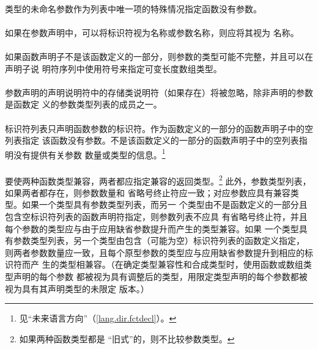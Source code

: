 \paragraph{}
类型的未命名参数作为列表中唯一项的特殊情况指定函数没有参数。

\paragraph{}
如果在参数声明中，可以将标识符视为名称或参数名称，则应将其视为
名称。

\paragraph{}
如果函数声明子不是该函数定义的一部分，则参数的类型可能不完整，并且可以在声明子说
明符序列中使用\tm{[*]}符号来指定可变长度数组类型。

\paragraph{}
参数声明的声明说明符中的存储类说明符（如果存在）将被忽略，除非声明的参数是函数定
义的参数类型列表的成员之一。

\paragraph{}
标识符列表只声明函数参数的标识符。作为函数定义的一部分的函数声明子中的空列表指定
该函数没有参数。不是该函数定义的一部分的函数声明子中的空列表指明没有提供有关参数
数量或类型的信息。\footnote{见``未来语言方向''（\ref{lang.dir.fctdecl}）。}

\paragraph{}
要使两种函数类型兼容，两者都应指定兼容的返回类型。\footnote{如果两种函数类型都是
``旧式''的，则不比较参数类型。} 此外，参数类型列表，如果两者都存在，则参数数量和
省略号终止符应一致；对应参数应具有兼容类型。如果一个类型具有参数类型列表，而另一
个类型由不是函数定义的一部分且包含空标识符列表的函数声明符指定，则参数列表不应具
有省略号终止符，并且每个参数的类型应与由于应用缺省参数提升而产生的类型兼容。如果
一个类型具有参数类型列表，另一个类型由包含（可能为空）标识符列表的函数定义指定，
则两者参数数量应一致，且每个原型参数的类型应与应用缺省参数提升到相应的标识符而产
生的类型相兼容。（在确定类型兼容性和合成类型时，使用函数或数组类型声明的每个参数
都被视为具有调整后的类型，用限定类型声明的每个参数都被视为具有其声明类型的未限定
版本。）


